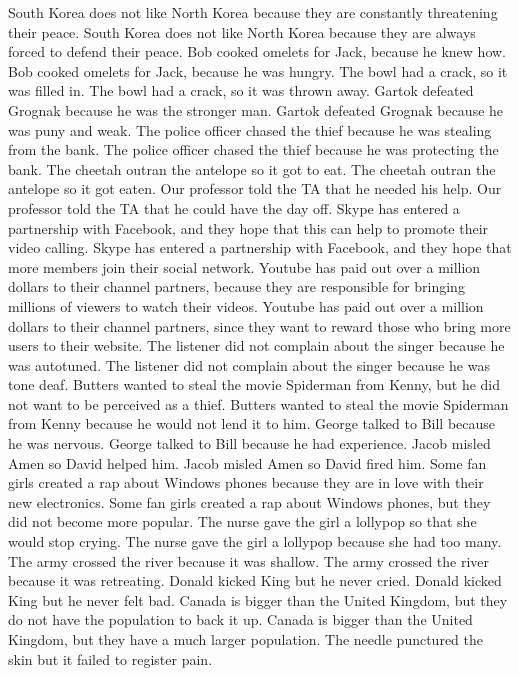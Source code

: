 \documentclass{article}
\begin{document}
\begin{enumerate}
	South Korea does not like North Korea because they are constantly threatening their peace.
	South Korea does not like North Korea because they are always forced to defend their peace.
	Bob cooked omelets for Jack, because he knew how.
	Bob cooked omelets for Jack, because he was hungry.
	The bowl had a crack, so it was filled in.
	The bowl had a crack, so it was thrown away.
	Gartok defeated Grognak because he was the stronger man.
	Gartok defeated Grognak because he was puny and weak.
	The police officer chased the thief because he was stealing from the bank.
	The police officer chased the thief because he was protecting the bank.
	The cheetah outran the antelope so it got to eat.
	The cheetah outran the antelope so it got eaten.
	Our professor told the TA that he needed his help.
	Our professor told the TA that he could have the day off.
	Skype has entered a partnership with Facebook, and they hope that this can help to promote their video calling.
	Skype has entered a partnership with Facebook, and they hope that more members join their social network.
	Youtube has paid out over a million dollars to their channel partners, because they are responsible for bringing millions of viewers to watch their videos.
	Youtube has paid out over a million dollars to their channel partners, since they want to reward those who bring more users to their website.
	The listener did not complain about the singer because he was autotuned.
	The listener did not complain about the singer because he was tone deaf.
	Butters wanted to steal the movie Spiderman from Kenny, but he did not want to be perceived as a thief.
	Butters wanted to steal the movie Spiderman from Kenny because he would not lend it to him.
	George talked to Bill because he was nervous.
	George talked to Bill because he had experience.
	Jacob misled Amen so David helped him.
	Jacob misled Amen so David fired him.
	Some fan girls created a rap about Windows phones because they are in love with their new electronics.
	Some fan girls created a rap about Windows phones, but they did not become more popular.
	The nurse gave the girl a lollypop so that she would stop crying.
	The nurse gave the girl a lollypop because she had too many.
	The army crossed the river because it was shallow.
	The army crossed the river because it was retreating.
	Donald kicked King but he never cried.
	Donald kicked King but he never felt bad.
	Canada is bigger than the United Kingdom, but they do not have the population to back it up.
	Canada is bigger than the United Kingdom, but they have a much larger population.
	The needle punctured the skin but it failed to register pain.

\end{enumerate}
\end{document}
